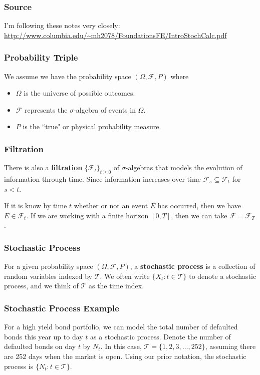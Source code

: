 \documentclass{beamer}
\begin{document}
\begin{frame}
\frametitle{Source} 
I'm following these notes very closely: \url{http://www.columbia.edu/~mh2078/FoundationsFE/IntroStochCalc.pdf}
\end{frame}

\begin{frame}
\frametitle{Probability Triple}
We assume we have the probability space $(\Omega, \mathcal{F}, P)$ where
\begin{itemize}
\item $\Omega$ is the universe of possible outcomes.
\item $\mathcal{F}$ represents the $\sigma$-algebra of events in $\Omega$.
\item $P$ is the ``true" or physical probability measure.
\end{itemize}
\end{frame}

\begin{frame}
\frametitle{Filtration}
There is also a {\bf filtration} $\{\mathcal{F}_t\}_{t\geq 0}$ of $\sigma$-algebras that models the evolution of information through time. Since information increases over time $\mathcal{F}_s \subseteq \mathcal{F}_t$ for $s < t$.

If it is know by time $t$ whether or not an event $E$ has occurred, then we have $E\in\mathcal{F}_t$. If we are working with a finite horizon $[0, T]$, then we can take $\mathcal{F} = \mathcal{F}_T$.
\end{frame}

\begin{frame}
\frametitle{Stochastic Process}

\begin{Definition}
For a given probability space $(\Omega, \mathcal{F}, P)$, a {\bf stochastic process} is a collection of random variables indexed by $\mathcal{T}$. We often write $\{X_t : t \in\mathcal{T}\}$ to denote a stochastic process, and we think of $\mathcal{T}$ as the time index.
\end{Definition}
\end{frame}

\begin{frame}
\frametitle{Stochastic Process Example}

\begin{Example}
For a high yield bond portfolio, we can model the total number of defaulted bonds this year up to day $t$ as a stochastic process. Denote the number of defaulted bonds on day $t$ by $N_t$. In this case, $\mathcal{T} = \{1, 2, 3,\ldots, 252\}$, assuming there are 252 days when the market is open. Using our prior notation, the stochastic process is $\{N_t : t\in\mathcal{T}\}$.
\end{Example}

\end{frame}
\end{document}
